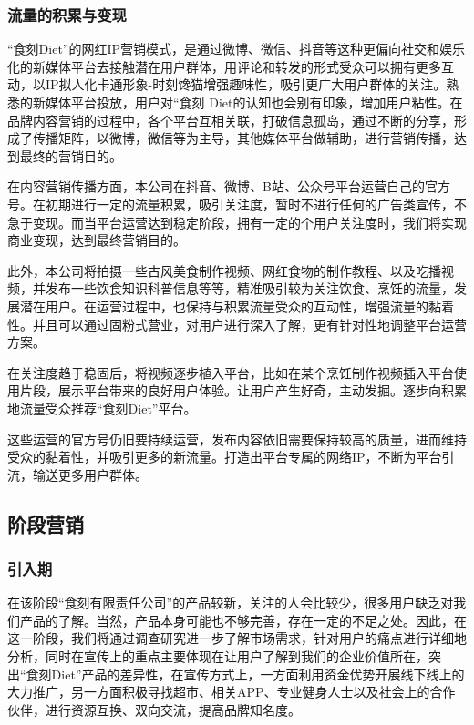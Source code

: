 \documentclass[UTF8,12pt]{ctexart}
\numberwithin{figure}{section}%
\begin{document}
\begin{spacing}{2}
\subsubsection{流量的积累与变现}

“食刻Diet”的网红IP营销模式，是通过微博、微信、抖音等这种更偏向社交和娱乐化的新媒体平台去接触潜在用户群体，用评论和转发的形式受众可以拥有更多互动，以IP拟人化卡通形象-时刻馋猫增强趣味性，吸引更广大用户群体的关注。熟悉的新媒体平台投放，用户对“食刻 Diet的认知也会别有印象，增加用户粘性。在品牌内容营销的过程中，各个平台互相关联，打破信息孤岛，通过不断的分享，形成了传播矩阵，以微博，微信等为主导，其他媒体平台做辅助，进行营销传播，达到最终的营销目的。

在内容营销传播方面，本公司在抖音、微博、B站、公众号平台运营自己的官方号。在初期进行一定的流量积累，吸引关注度，暂时不进行任何的广告类宣传，不急于变现。而当平台运营达到稳定阶段，拥有一定的个用户关注度时，我们将实现商业变现，达到最终营销目的。

此外，本公司将拍摄一些古风美食制作视频、网红食物的制作教程、以及吃播视频，并发布一些饮食知识科普信息等等，精准吸引较为关注饮食、烹饪的流量，发展潜在用户。在运营过程中，也保持与积累流量受众的互动性，增强流量的黏着性。并且可以通过固粉式营业，对用户进行深入了解，更有针对性地调整平台运营方案。

在关注度趋于稳固后，将视频逐步植入平台，比如在某个烹饪制作视频插入平台使用片段，展示平台带来的良好用户体验。让用户产生好奇，主动发掘。逐步向积累地流量受众推荐“食刻Diet”平台。 

这些运营的官方号仍旧要持续运营，发布内容依旧需要保持较高的质量，进而维持受众的黏着性，并吸引更多的新流量。打造出平台专属的网络IP，不断为平台引流，输送更多用户群体。



\subsection{阶段营销}

\subsubsection{引入期}

在该阶段“食刻有限责任公司”的产品较新，关注的人会比较少，很多用户缺乏对我们产品的了解。当然，产品本身可能也不够完善，存在一定的不足之处。因此，在这一阶段，我们将通过调查研究进一步了解市场需求，针对用户的痛点进行详细地分析，同时在宣传上的重点主要体现在让用户了解到我们的企业价值所在，突出“食刻Diet”产品的差异性，在宣传方式上，一方面利用资金优势开展线下线上的大力推广，另一方面积极寻找超市、相关APP、专业健身人士以及社会上的合作伙伴，进行资源互换、双向交流，提高品牌知名度。


\end{spacing}
\end{document}
